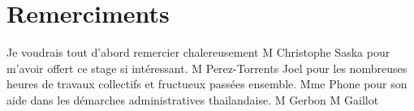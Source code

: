 \section*{Remerciments}
Je voudrais tout d'abord remercier chalereusement M Christophe Saska pour m'avoir offert ce stage si intéressant. M Perez-Torrents Joel pour les nombreuses heures de travaux collectifs et fructueux passées ensemble. Mme Phone pour son aide dans les démarches administratives thailandaise.
M Gerbon
M Gaillot
